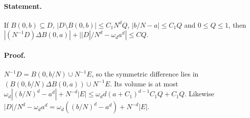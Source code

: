 \paragraph{Statement.} If $B(0,b)\subseteq D$, $|D\setminus B(0,b)|\leq C_1N^dQ$, $|b/N-a|\leq C_1Q$ and $0\leq Q\leq1$, then $|(N^{-1}D)\Delta B(0,a)|+||D|/N^d-\omega_da^d|\leq CQ$.
\paragraph{Proof.} $N^{-1}D=B(0,b/N)\cup N^{-1}E$, so the symmetric difference lies in $(B(0,b/N)\Delta B(0,a))\cup N^{-1}E$. Its volume is at most
$\omega_d|(b/N)^d-a^d|+N^{-d}|E|\leq\omega_dd(a+C_1)^{d-1}C_1Q+C_1Q$. Likewise $|D|/N^d-\omega_da^d=\omega_d((b/N)^d-a^d)+N^{-d}|E|$.
